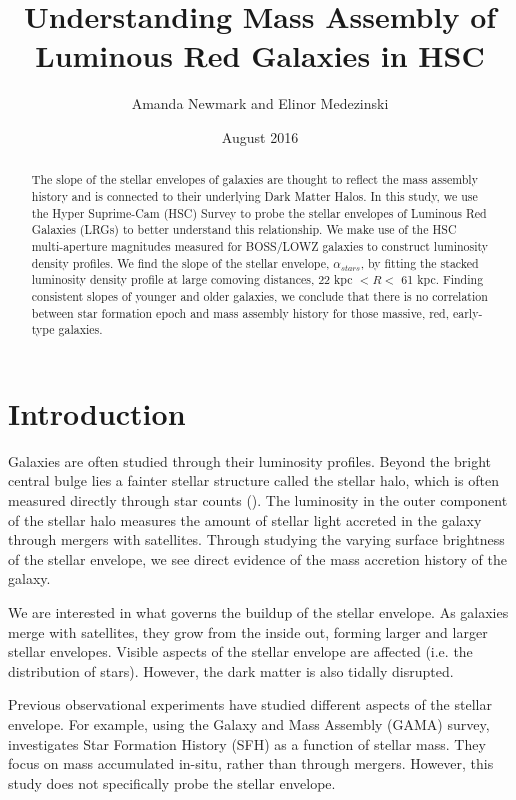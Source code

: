 \documentclass[apj]{emulateapj}
\begin{document}
 \title{Understanding Mass Assembly of Luminous Red Galaxies in HSC}
 \author{Amanda Newmark and Elinor Medezinski}
 \date{August 2016}

\begin{abstract}
The slope of the stellar envelopes of galaxies are thought to reflect the mass assembly history and is connected to their underlying Dark Matter Halos. In this study, we use the Hyper Suprime-Cam (HSC) Survey to probe the stellar envelopes of Luminous Red Galaxies (LRGs) to better understand this relationship. We make use of the HSC multi-aperture magnitudes measured for BOSS/LOWZ galaxies to construct luminosity density profiles. We find the slope of the stellar envelope, $\alpha_{stars}$, by fitting the stacked luminosity density profile at large comoving distances, 22 kpc $< R <$ 61 kpc. Finding consistent slopes of younger and older galaxies, we conclude that there is no correlation between star formation epoch and mass assembly history for those massive, red, early-type galaxies.
\end{abstract}

\section{Introduction}
Galaxies are often studied through their luminosity profiles. Beyond the bright central bulge lies a fainter stellar structure called the stellar halo, which is often measured directly through star counts (\cite{DSouza:2014}). The luminosity in the outer component of the stellar halo measures the amount of stellar light accreted in the galaxy through mergers with satellites. Through studying the varying surface brightness of the stellar envelope, we see direct evidence of the mass accretion history of the galaxy. 

We are interested in what governs the buildup of the stellar envelope. As galaxies merge with satellites, they grow from the inside out, forming larger and larger stellar envelopes. Visible aspects of the stellar envelope are affected (i.e. the distribution of stars). However, the dark matter is also tidally disrupted.

Previous observational experiments have studied different aspects of the stellar envelope. For example, using the Galaxy and Mass Assembly (GAMA) survey, \cite{Bauer:2013} investigates Star Formation History (SFH) as a function of stellar mass. They focus on mass accumulated in-situ, rather than through mergers.  However, this study does not specifically probe the stellar envelope.
\end{document}
